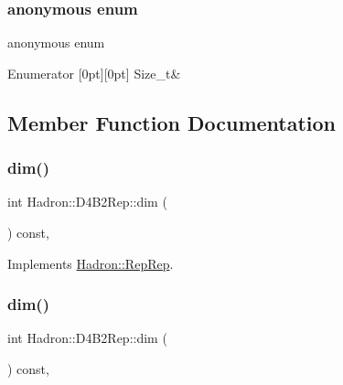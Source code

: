 \subsubsection{\texorpdfstring{anonymous enum}{anonymous enum}}
{\footnotesize\ttfamily anonymous enum}

\begin{DoxyEnumFields}{Enumerator}
[0pt][0pt]{}\mbox{\label{structHadron_1_1D4B2Rep_a2e5f2aeb565a8334ae5579a9aa01230ba97ac6905808810485fd79803205a0d7e}} 
Size\+\_\+t&\\
\hline

\end{DoxyEnumFields}


\subsection{Member Function Documentation}
\mbox{\label{structHadron_1_1D4B2Rep_a0a06eb2f05e5c89bb898a325aeff1793}} 
\subsubsection{\texorpdfstring{dim()}{dim()}\hspace{0.1cm}{\footnotesize\ttfamily [1/5]}}
{\footnotesize\ttfamily int Hadron\+::\+D4\+B2\+Rep\+::dim (\begin{DoxyParamCaption}{ }\end{DoxyParamCaption}) const\hspace{0.3cm}{\ttfamily [inline]}, {\ttfamily [virtual]}}



Implements \mbox{\hyperlink{structHadron_1_1RepRep_a92c8802e5ed7afd7da43ccfd5b7cd92b}{Hadron\+::\+Rep\+Rep}}.

\mbox{\label{structHadron_1_1D4B2Rep_a0a06eb2f05e5c89bb898a325aeff1793}} 
\subsubsection{\texorpdfstring{dim()}{dim()}\hspace{0.1cm}{\footnotesize\ttfamily [2/5]}}
{\footnotesize\ttfamily int Hadron\+::\+D4\+B2\+Rep\+::dim (\begin{DoxyParamCaption}{ }\end{DoxyParamCaption}) const\hspace{0.3cm}{\ttfamily [inline]}, {\ttfamily [virtual]}}




